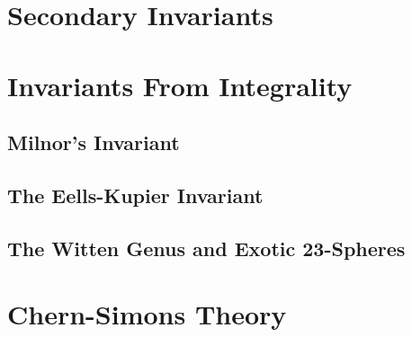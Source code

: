 \section{Secondary Invariants}

\section{Invariants From Integrality}

\subsection{Milnor's Invariant}
\subsection{The Eells-Kupier Invariant}
\subsection{The Witten Genus and Exotic $\mathbf{23}$-Spheres}

\section{Chern-Simons Theory}
